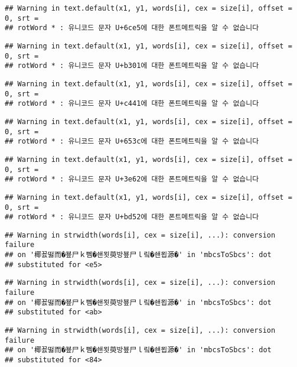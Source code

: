 \documentclass[]{article}
\begin{document}
\begin{verbatim}
## Warning in text.default(x1, y1, words[i], cex = size[i], offset = 0, srt =
## rotWord * : 유니코드 문자 U+6ce5에 대한 폰트메트릭을 알 수 없습니다
\end{verbatim}

\begin{verbatim}
## Warning in text.default(x1, y1, words[i], cex = size[i], offset = 0, srt =
## rotWord * : 유니코드 문자 U+b301에 대한 폰트메트릭을 알 수 없습니다
\end{verbatim}

\begin{verbatim}
## Warning in text.default(x1, y1, words[i], cex = size[i], offset = 0, srt =
## rotWord * : 유니코드 문자 U+c441에 대한 폰트메트릭을 알 수 없습니다
\end{verbatim}

\begin{verbatim}
## Warning in text.default(x1, y1, words[i], cex = size[i], offset = 0, srt =
## rotWord * : 유니코드 문자 U+653c에 대한 폰트메트릭을 알 수 없습니다
\end{verbatim}

\begin{verbatim}
## Warning in text.default(x1, y1, words[i], cex = size[i], offset = 0, srt =
## rotWord * : 유니코드 문자 U+3e62에 대한 폰트메트릭을 알 수 없습니다
\end{verbatim}

\begin{verbatim}
## Warning in text.default(x1, y1, words[i], cex = size[i], offset = 0, srt =
## rotWord * : 유니코드 문자 U+bd52에 대한 폰트메트릭을 알 수 없습니다
\end{verbatim}

\begin{verbatim}
## Warning in strwidth(words[i], cex = size[i], ...): conversion failure
## on '椰꾨떯而�뵾尸ｋ뻼�쇈묏萸방뵾尸ｌ맄�쇈묍源�' in 'mbcsToSbcs': dot
## substituted for <e5>
\end{verbatim}

\begin{verbatim}
## Warning in strwidth(words[i], cex = size[i], ...): conversion failure
## on '椰꾨떯而�뵾尸ｋ뻼�쇈묏萸방뵾尸ｌ맄�쇈묍源�' in 'mbcsToSbcs': dot
## substituted for <ab>
\end{verbatim}

\begin{verbatim}
## Warning in strwidth(words[i], cex = size[i], ...): conversion failure
## on '椰꾨떯而�뵾尸ｋ뻼�쇈묏萸방뵾尸ｌ맄�쇈묍源�' in 'mbcsToSbcs': dot
## substituted for <84>
\end{verbatim}
\end{document}
